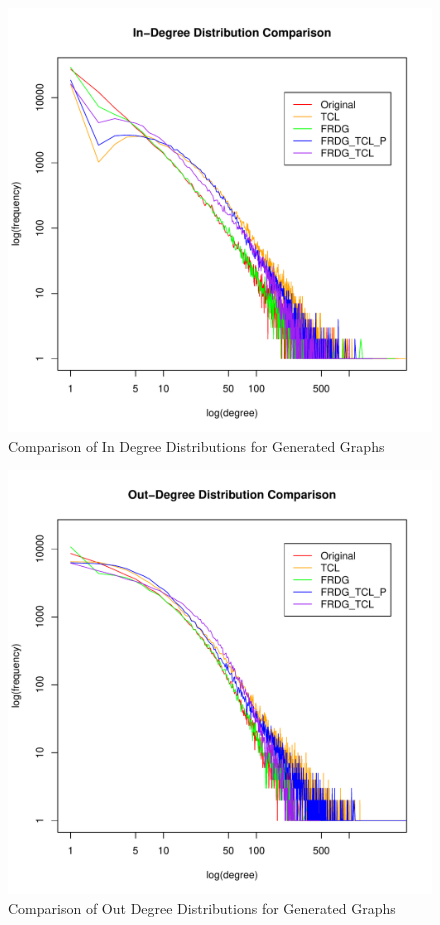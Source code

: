 \documentclass[pdftex,11pt,a4paper,twocolumn]{scrartcl}
\begin{document}
\begin{figure}[h!]
\centering
\includegraphics[width=\columnwidth]{generatedComparison_inDeg.pdf} 
\caption{Comparison of In Degree Distributions for Generated Graphs \label{fig:genInDeg}}
\end{figure}

\pagebreak

\begin{figure}[h!]
\centering
\includegraphics[width=\columnwidth]{generatedComparison_outDeg.pdf} 
\caption{Comparison of Out Degree Distributions for Generated Graphs \label{fig:genOutDeg}}
\end{figure}
\end{document}
